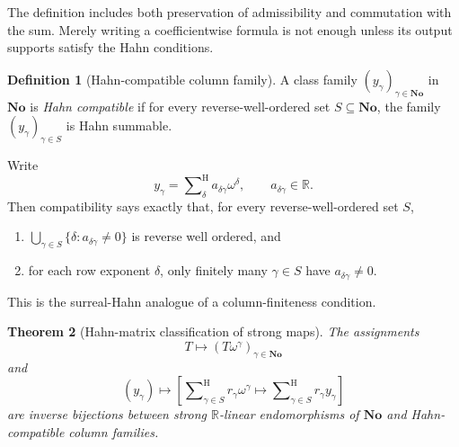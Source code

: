\documentclass[11pt,letterpaper]{article}
\numberwithin{equation}{section}
\newtheorem{theorem}{Theorem}[section]
\theoremstyle{definition}
\newtheorem{definition}[theorem]{Definition}
\theoremstyle{remark}
\newcommand{\No}{\mathbf{No}}
\newcommand{\R}{\mathbb{R}}
\newcommand{\sH}{\mathop{\sum}\nolimits^{\mathrm H}}
\begin{document}
The definition includes both preservation of admissibility and commutation
with the sum.  Merely writing a coefficientwise formula is not enough unless
its output supports satisfy the Hahn conditions.

\begin{definition}[Hahn-compatible column family]
A class family \((y_\gamma)_{\gamma\in\No}\) in \(\No\) is
\emph{Hahn compatible} if for every reverse-well-ordered set
\(S\subseteq\No\), the family \((y_\gamma)_{\gamma\in S}\) is Hahn summable.
\end{definition}

Write
\begin{equation}\label{rvs:eq:matrix-entry}
  y_\gamma=\sH_{\delta}
  a_{\delta\gamma}\omega^\delta,
  \qquad a_{\delta\gamma}\in\R.
\end{equation}
Then compatibility says exactly that, for every reverse-well-ordered set
\(S\),
\begin{enumerate}
\item \(\bigcup_{\gamma\in S}\{\delta:a_{\delta\gamma}\ne0\}\) is reverse
well ordered, and
\item for each row exponent \(\delta\), only finitely many
\(\gamma\in S\) have \(a_{\delta\gamma}\ne0\).
\end{enumerate}
This is the surreal-Hahn analogue of a column-finiteness condition.

\begin{theorem}[Hahn-matrix classification of strong maps]
\label{rvs:thm:strong-matrix}
The assignments
\begin{equation}\label{rvs:eq:column-correspondence}
  T\longmapsto(T\omega^\gamma)_{\gamma\in\No}
\end{equation}
and
\begin{equation}\label{rvs:eq:T-from-columns}
  (y_\gamma)\longmapsto
  \left[
  \sH_{\gamma\in S}r_\gamma\omega^\gamma
  \longmapsto
  \sH_{\gamma\in S}r_\gamma y_\gamma
  \right]
\end{equation}
are inverse bijections between strong \(\R\)-linear endomorphisms of \(\No\)
and Hahn-compatible column families.
\end{theorem}
\end{document}

